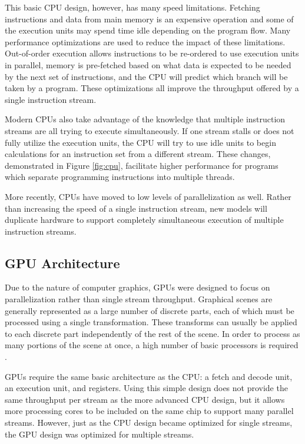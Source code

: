 This basic CPU design, however, has many speed limitations. Fetching instructions and data from main memory is an expensive operation and some of the execution units may spend time idle depending on the program flow. Many performance optimizations are used to reduce the impact of these limitations. Out-of-order execution allows instructions to be re-ordered to use execution units in parallel, memory is pre-fetched based on what data is expected to be needed by the next set of instructions, and the CPU will predict which branch will be taken by a program. These optimizations all improve the throughput offered by a single instruction stream.

Modern CPUs also take advantage of the knowledge that multiple instruction streams are all trying to execute simultaneously. If one stream stalls or does not fully utilize the execution units, the CPU will try to use idle units to begin calculations for an instruction set from a different stream. These changes, demonstrated in Figure \ref{fig:cpu}, facilitate higher performance for programs which separate programming instructions into multiple threads.

More recently, CPUs have moved to low levels of parallelization as well. Rather than increasing the speed of a single instruction stream, new models will duplicate hardware to support completely simultaneous execution of multiple instruction streams.

\subsection{GPU Architecture}

Due to the nature of computer graphics, GPUs were designed to focus on parallelization rather than single stream throughput. Graphical scenes are generally represented as a large number of discrete parts, each of which must be processed using a single transformation. These transforms can usually be applied to each discrete part independently of the rest of the scene. In order to process as many portions of the scene at once, a high number of basic processors is required \cite{gpgpu}.

GPUs require the same basic architecture as the CPU: a fetch and decode unit, an execution unit, and registers. Using this simple design does not provide the same throughput per stream as the more advanced CPU design, but it allows more processing cores to be included on the same chip to support many parallel streams. However, just as the CPU design became optimized for single streams, the GPU design was optimized for multiple streams.

